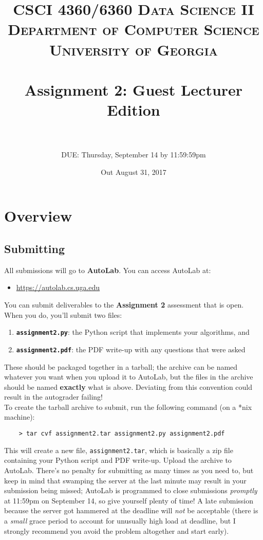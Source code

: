 \documentclass[paper=a4, fontsize=11pt]{scrartcl} %
\title{	
\normalfont \normalsize 
\textsc{CSCI 4360/6360 Data Science II} \\
\textsc{Department of Computer Science} \\
\textsc{University of Georgia} \\ [15pt] %
\horrule{0.5pt} \\[0.3cm] %
\huge Assignment 2: Guest Lecturer Edition \\ %
\horrule{2pt} \\[0.4cm] %
}
\author{DUE: Thursday, September 14 by 11:59:59pm} %
\date{\normalsize Out August 31, 2017}
\numberwithin{figure}{section} %
\numberwithin{table}{section} %
\begin{document}
\maketitle %


\section*{Overview}

\subsection{Submitting}

All submissions will go to \textbf{AutoLab}. You can access AutoLab at:

\begin{itemize}
	\item \url{https://autolab.cs.uga.edu}
\end{itemize}
	
You can submit deliverables to the \textbf{Assignment 2} assessment that is open. When you do, you'll submit two files:

\begin{enumerate}
	\item \texttt{\textbf{assignment2.py}}: the Python script that implements your algorithms, and
	\item \texttt{\textbf{assignment2.pdf}}: the PDF write-up with any questions that were asked
\end{enumerate}

These should be packaged together in a tarball; the archive can be named whatever you want when you upload it to AutoLab, but the files in the archive should be named \textbf{exactly} what is above. Deviating from this convention could result in the autograder failing! \\

To create the tarball archive to submit, run the following command (on a *nix machine):

\begin{verbatim}
	> tar cvf assignment2.tar assignment2.py assignment2.pdf
\end{verbatim}

This will create a new file, \texttt{assignment2.tar}, which is basically a zip file containing your Python script and PDF write-up. Upload the archive to AutoLab. There's no penalty for submitting as many times as you need to, but keep in mind that swamping the server at the last minute may result in your submission being missed; AutoLab is programmed to close submissions \emph{promptly} at 11:59pm on September 14, so give yourself plenty of time! A late submission because the server got hammered at the deadline will \emph{not} be acceptable (there is a \emph{small} grace period to account for unusually high load at deadline, but I strongly recommend you avoid the problem altogether and start early). \\
\end{document}
